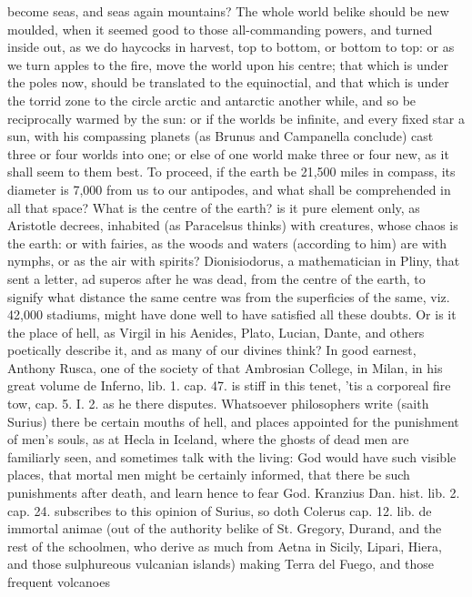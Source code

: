 {become seas, and seas again mountains? The whole world belike should be
new moulded, when it seemed good to those all-commanding powers, and
turned inside out, as we do haycocks in harvest, top to bottom, or
bottom to top: or as we turn apples to the fire, move the world upon
his centre; that which is under the poles now, should be translated to
the equinoctial, and that which is under the torrid zone to the circle
arctic and antarctic another while, and so be reciprocally warmed by
the sun: or if the worlds be infinite, and every fixed star a sun, with
his compassing planets (as Brunus and Campanella conclude) cast three
or four worlds into one; or else of one world make three or four new,
as it shall seem to them best. To proceed, if the earth be 21,500 miles
in compass, its diameter is 7,000 from us to our antipodes, and
what shall be comprehended in all that space? What is the centre of the
earth? is it pure element only, as Aristotle decrees, inhabited (as
 Paracelsus thinks) with creatures, whose chaos is the earth: or
with fairies, as the woods and waters (according to him) are with
nymphs, or as the air with spirits? Dionisiodorus, a mathematician in
Pliny, that sent a letter, ad superos after he was dead, from the
centre of the earth, to signify what distance the same centre was from
the superficies of the same, viz. 42,000 stadiums, might have done well
to have satisfied all these doubts. Or is it the place of hell, as
Virgil in his Aenides, Plato, Lucian, Dante, and others poetically
describe it, and as many of our divines think? In good earnest, Anthony
Rusca, one of the society of that Ambrosian College, in Milan, in his
great volume de Inferno, lib. 1. cap. 47. is stiff in this tenet, 'tis
a corporeal fire tow, cap. 5. I. 2. as he there disputes. Whatsoever
philosophers write (saith Surius) there be certain mouths of
hell, and places appointed for the punishment of men's souls, as at
Hecla in Iceland, where the ghosts of dead men are familiarly seen, and
sometimes talk with the living: God would have such visible places,
that mortal men might be certainly informed, that there be such
punishments after death, and learn hence to fear God. Kranzius Dan.
hist. lib. 2. cap. 24. subscribes to this opinion of Surius, so doth
Colerus cap. 12. lib. de immortal animae (out of the authority belike
of St. Gregory, Durand, and the rest of the schoolmen, who derive as
much from Aetna in Sicily, Lipari, Hiera, and those sulphureous
vulcanian islands) making Terra del Fuego, and those frequent volcanoes
}
